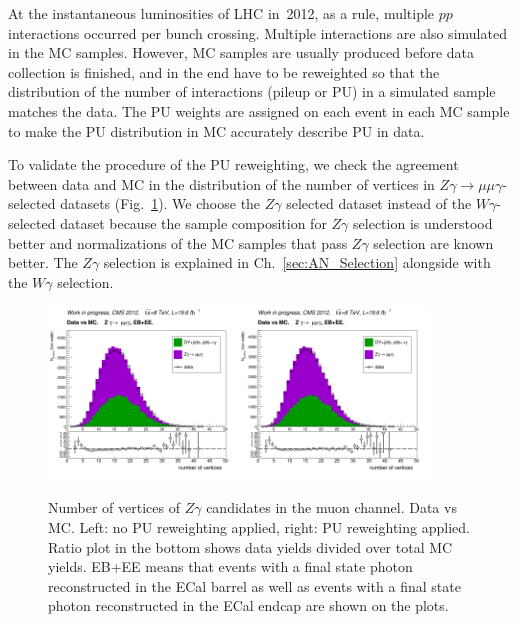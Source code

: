 At the instantaneous luminosities of LHC in~2012, as a rule, multiple $pp$ interactions occurred per bunch crossing. Multiple interactions are also simulated in the MC samples. However, MC samples are usually produced before data collection is finished, and in the end have to be reweighted so that the distribution of the number of interactions (pileup or PU) in a simulated sample matches the data. The PU weights are assigned on each event in each MC sample to make the PU distribution in MC accurately describe PU in data.



To validate the procedure of the PU reweighting, we check the agreement between data and MC in the distribution of the number of vertices in $Z\gamma\rightarrow\mu\mu\gamma$-selected datasets (Fig.~\ref{fig:DATAvsMC_nVtx}). We choose the $Z\gamma$ selected dataset instead of the $W\gamma$-selected dataset because the sample composition for $Z\gamma$ selection is understood better and normalizations of the MC samples that pass $Z\gamma$ selection are known better. The $Z\gamma$ selection is explained in Ch.~\ref{sec:AN_Selection} alongside with the $W\gamma$ selection.

\begin{figure}[htb]
  \begin{center}
   \includegraphics[width=0.45\textwidth]{../figs/figs_v11/MUON_ZGamma/PrepareYields/c_TotalDATAvsMC_EtaCommon__nVtx_noPU.png}\includegraphics[width=0.45\textwidth]{../figs/figs_v11/MUON_ZGamma/PrepareYields/c_TotalDATAvsMC_EtaCommon__nVtx.png}
  \caption{Number of vertices of $Z\gamma$ candidates in the muon channel. Data vs MC. Left: no PU reweighting applied, right: PU reweighting applied. Ratio plot in the bottom shows data yields divided over total MC yields. EB+EE means that events with a final state photon reconstructed in the ECal barrel as well as  events with a final state photon reconstructed in the ECal endcap are shown on the plots.}
  \label{fig:DATAvsMC_nVtx}
  \end{center}
\end{figure}
